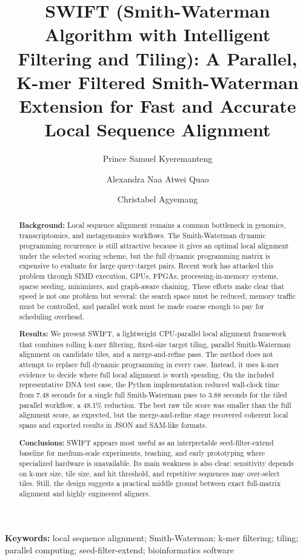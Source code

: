 \documentclass[11pt]{article}
\title{SWIFT (Smith-Waterman Algorithm with Intelligent Filtering and Tiling): A Parallel, K-mer Filtered Smith-Waterman Extension for Fast and Accurate Local Sequence Alignment}
\author{Prince Samuel Kyeremanteng \and Alexandra Naa Atwei Quao \and Christabel Agyemang}
\date{}
\begin{document}
\maketitle

\begin{abstract}
\textbf{Background:} Local sequence alignment remains a common bottleneck in genomics, transcriptomics, and metagenomics workflows. The Smith-Waterman dynamic programming recurrence is still attractive because it gives an optimal local alignment under the selected scoring scheme, but the full dynamic programming matrix is expensive to evaluate for large query-target pairs. Recent work has attacked this problem through SIMD execution, GPUs, FPGAs, processing-in-memory systems, sparse seeding, minimizers, and graph-aware chaining. These efforts make clear that speed is not one problem but several: the search space must be reduced, memory traffic must be controlled, and parallel work must be made coarse enough to pay for scheduling overhead.

\textbf{Results:} We present SWIFT, a lightweight CPU-parallel local alignment framework that combines rolling k-mer filtering, fixed-size target tiling, parallel Smith-Waterman alignment on candidate tiles, and a merge-and-refine pass. The method does not attempt to replace full dynamic programming in every case. Instead, it uses k-mer evidence to decide where full local alignment is worth spending. On the included representative DNA test case, the Python implementation reduced wall-clock time from 7.48 seconds for a single full Smith-Waterman pass to 3.88 seconds for the tiled parallel workflow, a 48.1\% reduction. The best raw tile score was smaller than the full alignment score, as expected, but the merge-and-refine stage recovered coherent local spans and exported results in JSON and SAM-like formats.

\textbf{Conclusions:} SWIFT appears most useful as an interpretable seed-filter-extend baseline for medium-scale experiments, teaching, and early prototyping where specialized hardware is unavailable. Its main weakness is also clear: sensitivity depends on k-mer size, tile size, and hit threshold, and repetitive sequences may over-select tiles. Still, the design suggests a practical middle ground between exact full-matrix alignment and highly engineered aligners.
\end{abstract}

\noindent\textbf{Keywords:} local sequence alignment; Smith-Waterman; k-mer filtering; tiling; parallel computing; seed-filter-extend; bioinformatics software
\end{document}
